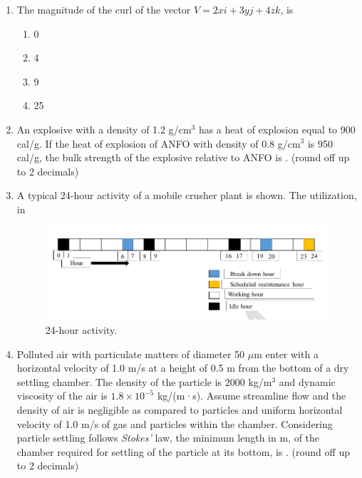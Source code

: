 \documentclass[journal]{IEEEtran}
\begin{document}
\begin{enumerate}[leftmargin=0pt]
\hfill{}
\item The magnitude of the curl of the vector $V = 2x i + 3y j + 4z k$, is
\begin{enumerate}
\item 0
\item 4
\item 9
\item 25
\end{enumerate}
\hfill{}
\item An explosive with a density of 1.2 g/cm$^3$ has a heat of explosion equal to 900 cal/g. If the heat of explosion of ANFO with density of 0.8 g/cm$^3$ is 950 cal/g, the bulk strength of the explosive relative to ANFO is \underline{\hspace{1.5cm}}. (round off up to 2 decimals)
\hfill{}
\item A typical 24-hour activity of a mobile crusher plant is shown. The utilization, in %
\begin{figure}[h!]
\centering
\includegraphics[width=0.5\linewidth]{figs/mobilecrusher.png}
\caption{24-hour activity.}
\label{fig:activity}
\end{figure}
\hfill{}
\item Polluted air with particulate matters of diameter 50 $\mu$m enter with a horizontal velocity of 1.0 m/s at a height of 0.5 m from the bottom of a dry settling chamber. The density of the particle is 2000 kg/m$^3$ and dynamic viscosity of the air is $1.8 \times 10^{-5}$ kg/(m·s). Assume streamline flow and the density of air is negligible as compared to particles and uniform horizontal velocity of 1.0 m/s of gas and particles within the chamber. Considering particle settling follows \textit{Stokes'} law, the minimum length in m, of the chamber required for settling of the particle at its bottom, is \underline{\hspace{1.5cm}}. (round off up to 2 decimals)


\end{enumerate}
\end{document}
